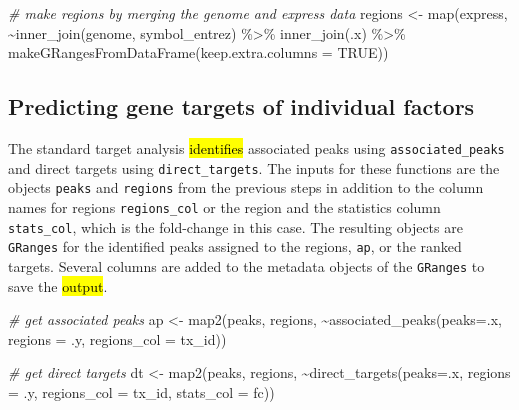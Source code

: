 \documentclass[9pt,a4paper,]{extarticle}
\newenvironment{Shaded}{\begin{snugshade}}{\end{snugshade}}
\newcommand{\AttributeTok}[1]{\textcolor[rgb]{0.77,0.63,0.00}{#1}}
\newcommand{\CommentTok}[1]{\textcolor[rgb]{0.56,0.35,0.01}{\textit{#1}}}
\newcommand{\ConstantTok}[1]{\textcolor[rgb]{0.00,0.00,0.00}{#1}}
\newcommand{\FunctionTok}[1]{\textcolor[rgb]{0.00,0.00,0.00}{#1}}
\newcommand{\NormalTok}[1]{#1}
\newcommand{\OtherTok}[1]{\textcolor[rgb]{0.56,0.35,0.01}{#1}}
\newcommand{\SpecialCharTok}[1]{\textcolor[rgb]{0.00,0.00,0.00}{#1}}
\newcommand{\StringTok}[1]{\textcolor[rgb]{0.31,0.60,0.02}{#1}}
\begin{document}
\begin{Shaded}
\begin{Highlighting}[]
\CommentTok{\# make regions by merging the genome and express data}
\NormalTok{regions }\OtherTok{\textless{}{-}} \FunctionTok{map}\NormalTok{(express,}
               \SpecialCharTok{\textasciitilde{}}\FunctionTok{inner\_join}\NormalTok{(genome, symbol\_entrez) }\SpecialCharTok{\%\textgreater{}\%}
                 \FunctionTok{inner\_join}\NormalTok{(.x) }\SpecialCharTok{\%\textgreater{}\%}
                 \FunctionTok{makeGRangesFromDataFrame}\NormalTok{(}\AttributeTok{keep.extra.columns =} \ConstantTok{TRUE}\NormalTok{))}
\end{Highlighting}
\end{Shaded}

\hypertarget{predicting-gene-targets-of-individual-factors}{%
\subsection{Predicting gene targets of individual factors}\label{predicting-gene-targets-of-individual-factors}}

The standard target analysis \hl{identifies} associated peaks using \texttt{associated\_peaks} and direct targets using \texttt{direct\_targets}. The inputs for these functions are the objects \texttt{peaks} and \texttt{regions} from the previous steps in addition to the column names for regions \texttt{regions\_col} or the region and the statistics column \texttt{stats\_col}, which is the fold-change in this case. The resulting objects are \texttt{GRanges} for the identified peaks assigned to the regions, \texttt{ap}, or the ranked targets. Several columns are added to the metadata objects of the \texttt{GRanges} to save the \hl{output}.

\begin{Shaded}
\begin{Highlighting}[]
\CommentTok{\# get associated peaks}
\NormalTok{ap }\OtherTok{\textless{}{-}} \FunctionTok{map2}\NormalTok{(peaks, regions,}
           \SpecialCharTok{\textasciitilde{}}\FunctionTok{associated\_peaks}\NormalTok{(}\AttributeTok{peaks=}\NormalTok{.x,}
                             \AttributeTok{regions =}\NormalTok{ .y,}
                             \AttributeTok{regions\_col =} \StringTok{\textquotesingle{}tx\_id\textquotesingle{}}\NormalTok{))}

\CommentTok{\# get direct targets}
\NormalTok{dt }\OtherTok{\textless{}{-}} \FunctionTok{map2}\NormalTok{(peaks, regions,}
           \SpecialCharTok{\textasciitilde{}}\FunctionTok{direct\_targets}\NormalTok{(}\AttributeTok{peaks=}\NormalTok{.x,}
                           \AttributeTok{regions =}\NormalTok{ .y,}
                           \AttributeTok{regions\_col =} \StringTok{\textquotesingle{}tx\_id\textquotesingle{}}\NormalTok{,}
                           \AttributeTok{stats\_col =} \StringTok{\textquotesingle{}fc\textquotesingle{}}\NormalTok{))}
\end{Highlighting}
\end{Shaded}
\end{document}
